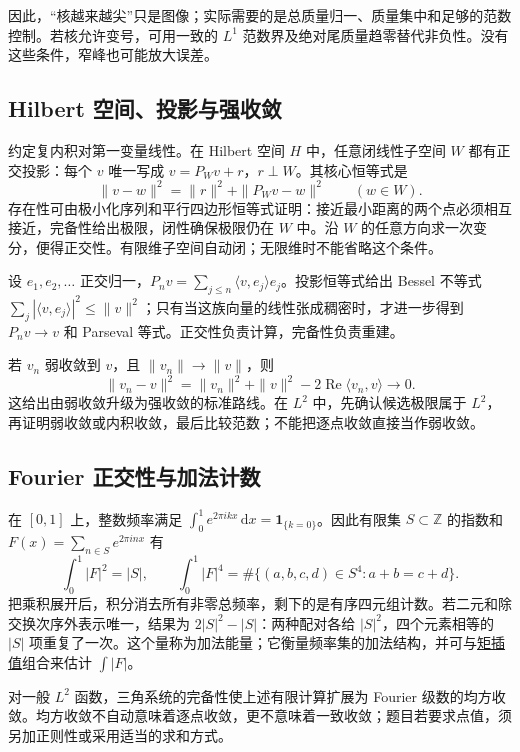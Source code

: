 \documentclass[12pt,fontset=fandol]{ctexart}
\begin{document}
因此，“核越来越尖”只是图像；实际需要的是总质量归一、质量集中和足够的范数控制。若核允许变号，可用一致的 $L^1$ 范数界及绝对尾质量趋零替代非负性。没有这些条件，窄峰也可能放大误差。

\subsection{Hilbert 空间、投影与强收敛}

\label{app:integration-hilbert}

约定复内积对第一变量线性。在 Hilbert 空间 $H$ 中，任意闭线性子空间 $W$ 都有正交投影：每个 $v$ 唯一写成 $v=P_Wv+r$，$r\perp W$。其核心恒等式是
\[
\|v-w\|^2=\|r\|^2+\|P_Wv-w\|^2\qquad(w\in W).
\]
存在性可由极小化序列和平行四边形恒等式证明：接近最小距离的两个点必须相互接近，完备性给出极限，闭性确保极限仍在 $W$ 中。沿 $W$ 的任意方向求一次变分，便得正交性。有限维子空间自动闭；无限维时不能省略这个条件。

设 $e_1,e_2,\ldots$ 正交归一，$P_nv=\sum_{j\leq n}\langle v,e_j\rangle e_j$。投影恒等式给出 Bessel 不等式 $\sum_j|\langle v,e_j\rangle|^2\leq\|v\|^2$；只有当这族向量的线性张成稠密时，才进一步得到 $P_nv\to v$ 和 Parseval 等式。正交性负责计算，完备性负责重建。

若 $v_n$ 弱收敛到 $v$，且 $\|v_n\|\to\|v\|$，则
\[
\|v_n-v\|^2=\|v_n\|^2+\|v\|^2-2\operatorname{Re}\langle v_n,v\rangle\longrightarrow0.
\]
这给出由弱收敛升级为强收敛的标准路线。在 $L^2$ 中，先确认候选极限属于 $L^2$，再证明弱收敛或内积收敛，最后比较范数；不能把逐点收敛直接当作弱收敛。

\subsection{Fourier 正交性与加法计数}

\label{app:integration-fourier}

在 $[0,1]$ 上，整数频率满足 $\int_0^1e^{2\pi ikx}\,\mathrm dx=\mathbf1_{\{k=0\}}$。因此有限集 $S\subset\mathbb Z$ 的指数和 $F(x)=\sum_{n\in S}e^{2\pi inx}$ 有
\[
\int_0^1|F|^2=|S|,\qquad
\int_0^1|F|^4=\#\{(a,b,c,d)\in S^4:a+b=c+d\}.
\]
把乘积展开后，积分消去所有非零总频率，剩下的是有序四元组计数。若二元和除交换次序外表示唯一，结果为 $2|S|^2-|S|$：两种配对各给 $|S|^2$，四个元素相等的 $|S|$ 项重复了一次。这个量称为加法能量；它衡量频率集的加法结构，并可与\hyperref[app:estimate-moments]{矩插值}组合来估计 $\int|F|$。

对一般 $L^2$ 函数，三角系统的完备性使上述有限计算扩展为 Fourier 级数的均方收敛。均方收敛不自动意味着逐点收敛，更不意味着一致收敛；题目若要求点值，须另加正则性或采用适当的求和方式。
\end{document}
